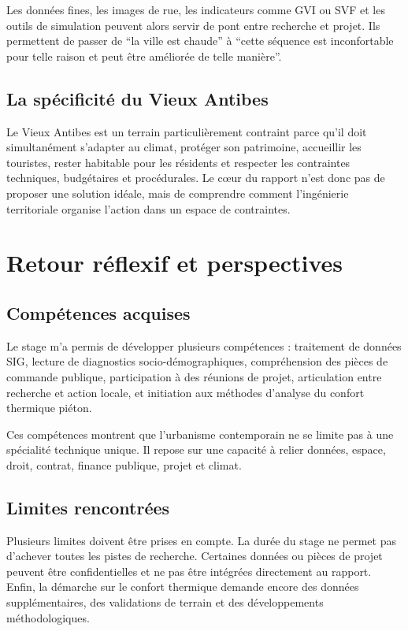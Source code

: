 \documentclass[11pt,a4paper]{report}
\begin{document}
Les données fines, les images de rue, les indicateurs comme GVI ou SVF et les outils de simulation peuvent alors servir de pont entre recherche et projet. Ils permettent de passer de \enquote{la ville est chaude} à \enquote{cette séquence est inconfortable pour telle raison et peut être améliorée de telle manière}.

\section{La spécificité du Vieux Antibes}

Le Vieux Antibes est un terrain particulièrement contraint parce qu'il doit simultanément s'adapter au climat, protéger son patrimoine, accueillir les touristes, rester habitable pour les résidents et respecter les contraintes techniques, budgétaires et procédurales. Le cœur du rapport n'est donc pas de proposer une solution idéale, mais de comprendre comment l'ingénierie territoriale organise l'action dans un espace de contraintes.

\chapter{Retour réflexif et perspectives}

\section{Compétences acquises}

Le stage m'a permis de développer plusieurs compétences : traitement de données SIG, lecture de diagnostics socio-démographiques, compréhension des pièces de commande publique, participation à des réunions de projet, articulation entre recherche et action locale, et initiation aux méthodes d'analyse du confort thermique piéton.

Ces compétences montrent que l'urbanisme contemporain ne se limite pas à une spécialité technique unique. Il repose sur une capacité à relier données, espace, droit, contrat, finance publique, projet et climat.

\section{Limites rencontrées}

Plusieurs limites doivent être prises en compte. La durée du stage ne permet pas d'achever toutes les pistes de recherche. Certaines données ou pièces de projet peuvent être confidentielles et ne pas être intégrées directement au rapport. Enfin, la démarche sur le confort thermique demande encore des données supplémentaires, des validations de terrain et des développements méthodologiques.
\end{document}
